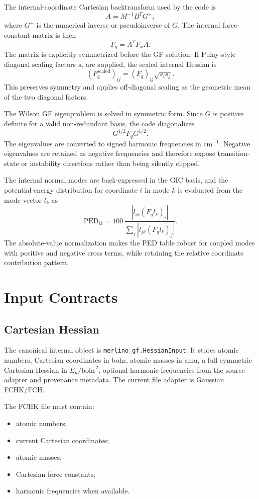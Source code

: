 \documentclass[11pt]{article}
\newcommand{\bohr}{\text{bohr}}
\begin{document}
The internal-coordinate Cartesian backtransform used by the code is
\[
  A = M^{-1} B^T G^+ ,
\]
where \(G^+\) is the numerical inverse or pseudoinverse of \(G\).  The internal
force-constant matrix is then
\[
  F_q = A^T F_x A .
\]
The matrix is explicitly symmetrized before the GF solution.  If Pulay-style
diagonal scaling factors \(s_i\) are supplied, the scaled internal Hessian is
\[
  (F_q^\mathrm{scaled})_{ij}
  =
  (F_q)_{ij}\sqrt{s_i s_j}.
\]
This preserves symmetry and applies off-diagonal scaling as the geometric mean
of the two diagonal factors.

The Wilson GF eigenproblem is solved in symmetric form.  Since \(G\) is
positive definite for a valid non-redundant basis, the code diagonalizes
\[
  G^{1/2} F_q G^{1/2}.
\]
The eigenvalues are converted to signed harmonic frequencies in cm\(^{-1}\).
Negative eigenvalues are retained as negative frequencies and therefore expose
transition-state or instability directions rather than being silently clipped.

The internal normal modes are back-expressed in the GIC basis, and the
potential-energy distribution for coordinate \(i\) in mode \(k\) is evaluated
from the mode vector \(l_k\) as
\[
  \mathrm{PED}_{ik}
  =
  100\,
  \frac{|l_{ik}(F_q l_k)_i|}
       {\sum_j |l_{jk}(F_q l_k)_j|}.
\]
The absolute-value normalization makes the PED table robust for coupled modes
with positive and negative cross terms, while retaining the relative
coordinate contribution pattern.

\section{Input Contracts}

\subsection{Cartesian Hessian}

The canonical internal object is \texttt{merlino\_gf.HessianInput}.  It stores
atomic numbers, Cartesian coordinates in bohr, atomic masses in amu, a full
symmetric Cartesian Hessian in \(E_h/\bohr^2\), optional harmonic frequencies
from the source adapter and provenance metadata.  The current file adapter is
Gaussian FCHK/FCH.

The FCHK file must contain:

\begin{itemize}
  \item atomic numbers;
  \item current Cartesian coordinates;
  \item atomic masses;
  \item Cartesian force constants;
  \item harmonic frequencies when available.
\end{itemize}
\end{document}
